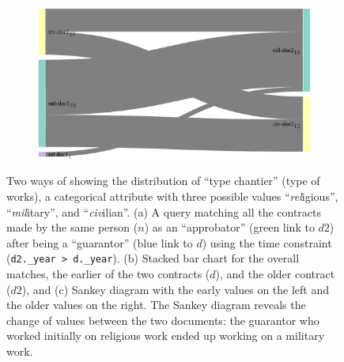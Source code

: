 \begin{figure}
\begin{subfigure}[b]{0.30\linewidth}
        \caption{}
    \end{subfigure}
    \begin{subfigure}[b]{0.33\linewidth}
        \includegraphics[width=\textwidth]{static/figures/ComBiNet/OriginalPaperFigures/CGF/sankeyPLot/sankey_bigger.pdf}
        \caption{}
    \end{subfigure}

    \caption{Two ways of showing the distribution of ``type chantier'' (type of works), a categorical attribute with three possible values ``\textsl{rel}igious'', ``\textsl{mil}itary'', and ``\textsl{civ}ilian''.
        (a) A query matching all the contracts made by the same person ($n$) as an ``approbator'' (green link to $d2$) after being a ``guarantor'' (blue link to $d$) using the time constraint (\texttt{d2.\_year > d.\_year}). (b) Stacked bar chart for the overall matches, the earlier of the two contracts ($d$), and the older contract ($d2$), and (c) Sankey diagram with the early values on the left and the older values on the right.
        The Sankey diagram reveals the change of values between the two documents: the guarantor who worked initially on religious work ended up working on a military work.} \label{fig:sankeys}
\end{figure}


